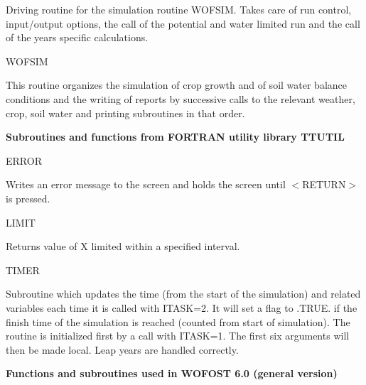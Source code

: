 \begin{indenting}{5.08cm}
Driving routine for the simulation routine WOFSIM. Takes
care of run control, input/output options, the call of the
potential and water limited run and the call of the years
specific calculations.
\end{indenting}
WOFSIM
\testlastline

\begin{indenting}{5.08cm}
This routine organizes the simulation of crop growth and of
soil water balance conditions and the writing of reports by
successive calls to the relevant weather, crop, soil water and
printing subroutines in that order.
\end{indenting}

\bigskip
\bigskip
\bigskip
\bigskip
\bigskip
{\bf {\large Subroutines and functions from FORTRAN utility library TTUTIL}}

ERROR
\testlastline

\begin{indenting}{5.08cm}
Writes an error message to the screen and holds the screen
until $<$RE\-TURN$>$ is pressed.\hfill  
\end{indenting}
LIMIT
\testlastline

\begin{indenting}{5.08cm}
Returns value of X limited within a specified interval.\hfill  
\end{indenting}
TIMER
\testlastline

\begin{indenting}{5.08cm}
Subroutine which updates the time (from the start of the
simula\-tion) and related variables each time it is called with
ITASK=2. It will set a flag to .TRUE. if the finish time of
the simulation is reached (counted from start of simulation).
The routine is initialized first by a call with ITASK=1. The
first six arguments will then be made local. Leap years are
handled correctly.\hfill  
\end{indenting}

\bigskip
\bigskip
\bigskip
{\bf {\large Functions and subroutines used in WOFOST 6.0 (general version)}}

